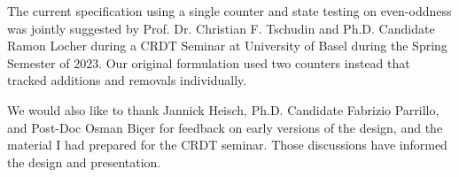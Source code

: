 \documentclass[11pt, oneside]{article}   	%
\begin{document}
The current specification using a single counter and state testing on even-oddness was jointly suggested by Prof. Dr. Christian F. Tschudin and Ph.D. Candidate Ramon Locher during a CRDT Seminar at University of Basel during the Spring Semester of 2023. Our original formulation used two counters instead that tracked additions and removals individually.

We would also like to thank Jannick Heisch, Ph.D. Candidate Fabrizio Parrillo, and Post-Doc Osman Biçer for feedback on early versions of the design, and the material I had prepared for the CRDT seminar. Those discussions have informed the design and presentation.

\newpage



\end{document}
